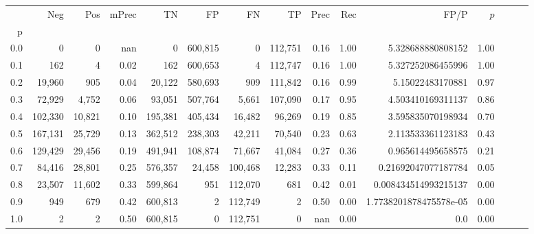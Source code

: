 \begin{tabular}{rrrrrrrrrrrrrrr}
\toprule
{} &      Neg &     Pos & mPrec &       TN &       FP &       FN &       TP &  Prec &   Rec &                    FP/P & $\hat{p}$ \\
p   &          &         &       &          &          &          &          &       &       &                         &           \\
\midrule
0.0 &        0 &       0 &   nan &        0 &  600,815 &        0 &  112,751 &  0.16 &  1.00 &       5.328688880808152 &      1.00 \\
0.1 &      162 &       4 &  0.02 &      162 &  600,653 &        4 &  112,747 &  0.16 &  1.00 &       5.327252086455996 &      1.00 \\
0.2 &   19,960 &     905 &  0.04 &   20,122 &  580,693 &      909 &  111,842 &  0.16 &  0.99 &        5.15022483170881 &      0.97 \\
0.3 &   72,929 &   4,752 &  0.06 &   93,051 &  507,764 &    5,661 &  107,090 &  0.17 &  0.95 &       4.503410169311137 &      0.86 \\
0.4 &  102,330 &  10,821 &  0.10 &  195,381 &  405,434 &   16,482 &   96,269 &  0.19 &  0.85 &       3.595835070198934 &      0.70 \\
0.5 &  167,131 &  25,729 &  0.13 &  362,512 &  238,303 &   42,211 &   70,540 &  0.23 &  0.63 &       2.113533361123183 &      0.43 \\
0.6 &  129,429 &  29,456 &  0.19 &  491,941 &  108,874 &   71,667 &   41,084 &  0.27 &  0.36 &       0.965614495658575 &      0.21 \\
0.7 &   84,416 &  28,801 &  0.25 &  576,357 &   24,458 &  100,468 &   12,283 &  0.33 &  0.11 &     0.21692047077187784 &      0.05 \\
0.8 &   23,507 &  11,602 &  0.33 &  599,864 &      951 &  112,070 &      681 &  0.42 &  0.01 &    0.008434514993215137 &      0.00 \\
0.9 &      949 &     679 &  0.42 &  600,813 &        2 &  112,749 &        2 &  0.50 &  0.00 &  1.7738201878475578e-05 &      0.00 \\
1.0 &        2 &       2 &  0.50 &  600,815 &        0 &  112,751 &        0 &   nan &  0.00 &                     0.0 &      0.00 \\
\bottomrule
\end{tabular}
